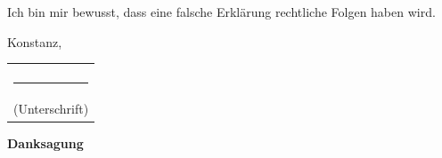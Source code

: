 \vspace*{1cm}

\noindent
Ich bin mir bewusst, dass eine falsche Erklärung rechtliche Folgen haben wird.\\

\vspace*{3cm}

\noindent
Konstanz, \abgabedatum \hfill \begin{tabular}{c} \\ \\ \rule{5cm}{1pt} \\ (Unterschrift)\end{tabular}

\newpage
\begin{center}
{\Large \textbf{Danksagung}}
\end{center}
\bigskip
\danksagung

\tableofcontents
{}
\newpage
{}